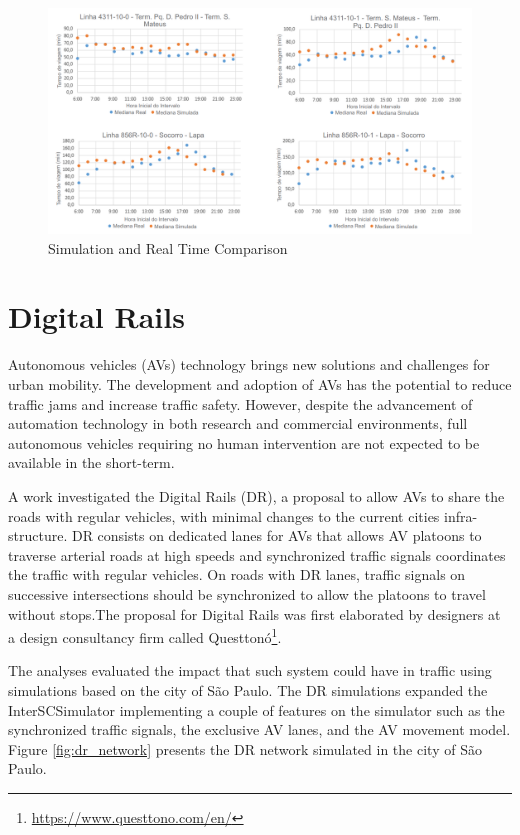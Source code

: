 \begin{figure}[!htb]
\centering
\includegraphics[width=1\textwidth]{figuras/chap-uses/bus_model.png}
\caption{Simulation and Real Time Comparison}
\label{fig:simulation_real_comparison}
\end{figure}

\section{Digital Rails}
\label{sec:digital_rails}

Autonomous vehicles (AVs) technology brings new solutions and challenges for urban mobility. The development and adoption of AVs has the potential to reduce traffic jams and increase traffic safety. However, despite the advancement of automation technology in both research and commercial environments, full autonomous vehicles requiring no human intervention are not expected to be available in the short-term. 

A work investigated the Digital Rails (DR), a proposal to allow AVs to share the roads with regular vehicles, with minimal changes to the current cities infra-structure. DR consists on dedicated lanes for AVs that allows AV platoons to traverse arterial roads at high speeds and synchronized traffic signals coordinates the traffic with regular vehicles. On roads with DR lanes, traffic signals on successive intersections should be synchronized to allow the platoons to travel without stops.The proposal for Digital Rails was first elaborated by designers at a design consultancy firm called Questtonó\footnote{\url{https://www.questtono.com/en/}}. 

The analyses evaluated the impact that such system could have in traffic using simulations based on the city of São Paulo. The DR simulations expanded the InterSCSimulator implementing a couple of features on the simulator such as the synchronized traffic signals, the exclusive AV lanes, and the AV movement model. Figure \ref{fig:dr_network} presents the DR network simulated in the city of S\~ao Paulo.

